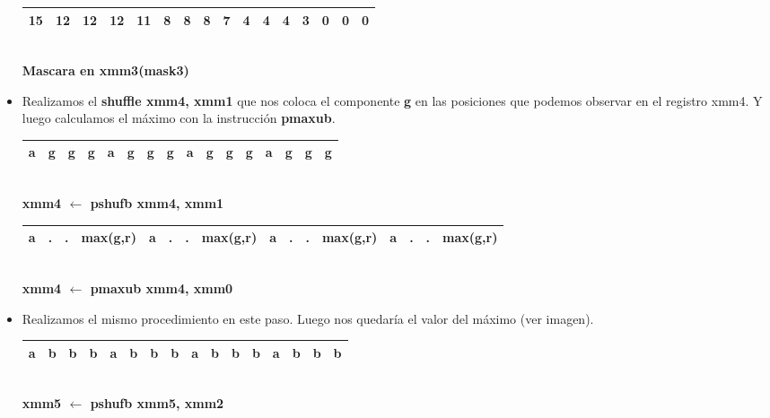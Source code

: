 \begin{itemize}
		\begin{center}
		   \begin{tabular}{| c | c | c | c || c | c | c | c || c | c | c | c || c | c | c | c |}
			 \hline
			 15 & 12 & 12 & 12 & 11 & 8 & 8 & 8 & 7 & 4 & 4 & 4 & 3 & 0 & 0 & 0 \\ \hline
		   \end{tabular}
		   \\ \textbf{Mascara en xmm3(mask3)}
		\end{center}

	\item Realizamos el \textbf{shuffle xmm4, xmm1} que nos coloca el componente \textbf{g} en las posiciones que podemos observar en el registro xmm4. Y luego calculamos el máximo con la instrucción \textbf{pmaxub}. 

		\begin{center}
		   \begin{tabular}{| c | c | c | c || c | c | c | c || c | c | c | c || c | c | c | c |}
			 \hline
			 a & g & g & g & a & g & g & g & a & g & g & g & a & g & g & g \\ \hline
		   \end{tabular}
		   \\ \textbf{xmm4 $\gets$ pshufb xmm4, xmm1}
		\end{center}


		\begin{center}
		   \begin{tabular}{| c | c | c | c || c | c | c | c || c | c | c | c || c | c | c | c |}
			 \hline
			 a & . & . & max(g,r) & a & . & . & max(g,r) & a & . & . & max(g,r) & a & . & . & max(g,r)  \\ \hline
		   \end{tabular}
		   \\ \textbf{xmm4 $ \gets $ pmaxub xmm4, xmm0}
		\end{center}

	\item Realizamos el mismo procedimiento en este paso. Luego nos quedaría el valor del máximo (ver imagen). 
		\begin{center}
		   \begin{tabular}{| c | c | c | c || c | c | c | c || c | c | c | c || c | c | c | c |}
			 \hline
			 a & b & b & b & a & b & b & b & a & b & b & b & a & b & b & b \\ \hline
		   \end{tabular}
		   \\ \textbf{xmm5 $\gets$ pshufb xmm5, xmm2}
		\end{center}


\end{itemize}
